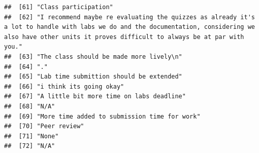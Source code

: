 \documentclass[
]{article}
\begin{document}
\begin{verbatim}
##  [61] "Class participation"                                                                                                                                                                                                   
##  [62] "I recommend maybe re evaluating the quizzes as already it's a lot to handle with labs we do and the documentation, considering we also have other units it proves difficult to always be at par with you."             
##  [63] "The class should be made more lively\n"                                                                                                                                                                                
##  [64] "."                                                                                                                                                                                                                     
##  [65] "Lab time submittion should be extended"                                                                                                                                                                                
##  [66] "i think its going okay"                                                                                                                                                                                                
##  [67] "A little bit more time on labs deadline"                                                                                                                                                                               
##  [68] "N/A"                                                                                                                                                                                                                   
##  [69] "More time added to submission time for work"                                                                                                                                                                           
##  [70] "Peer review"                                                                                                                                                                                                           
##  [71] "None"                                                                                                                                                                                                                  
##  [72] "N/A"                                                                                                                                                                                                                   

\end{verbatim}
\end{document}
